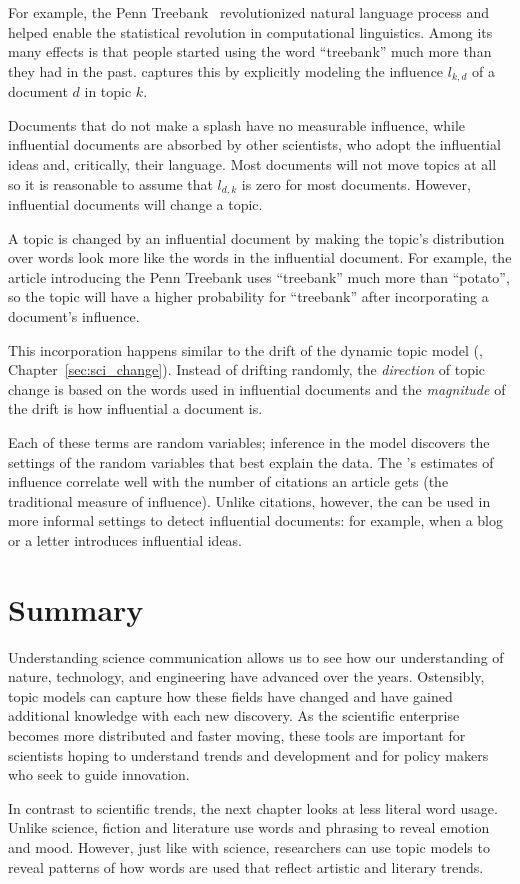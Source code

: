 For example, the Penn Treebank~\citep{marcus-93} revolutionized natural language
process and helped enable the statistical revolution in computational
linguistics.  Among its many effects is that people started using the word
``treebank'' much more than they had in the past.   captures this by
explicitly modeling the influence $l_{k,d}$ of a document $d$ in topic
$k$.

Documents that do not make a splash have no measurable influence, while influential
documents are absorbed by other scientists, who adopt the influential ideas and, critically, their language.  Most documents will not move topics
at all so it is reasonable to assume that $l_{d,k}$ is zero for most
documents.  However, influential documents will change a topic.

A topic is changed by an influential document by making the topic's
distribution over words look more like the words in the influential document.  For example, the article
introducing the Penn Treebank uses ``treebank'' much more than
``potato'', so the topic will have a higher probability for
``treebank'' after incorporating a document's influence.

This incorporation happens similar to the drift of the dynamic topic
model (, Chapter~\ref{sec:sci_change}).  Instead of drifting
randomly, the \emph{direction} of topic change is based on the words
used in influential documents and the \emph{magnitude} of the drift is
how influential a document is.

Each of these terms are random variables; inference in the model discovers the
settings of the random variables that best explain the data.  The 's
estimates of influence correlate well with the number of citations an article
gets (the traditional measure of influence).  Unlike citations, however, the
 can be used in more informal settings to detect influential
documents: for example, when a blog or a letter introduces influential
ideas.

\section{Summary}

Understanding science communication allows us to see how our
understanding of nature, technology, and engineering have advanced
over the years.
Ostensibly, topic models can capture how these fields have changed and
have gained additional knowledge with each new discovery.
As the scientific enterprise becomes more distributed and faster
moving, these tools are important for scientists hoping to understand
trends and development and for policy makers who seek to guide
innovation.

In contrast to scientific trends, the next chapter looks at less
literal word usage.
Unlike science, fiction and literature use words and phrasing to
reveal emotion and mood.
However, just like with science, researchers can use topic models to reveal patterns of how words are used
that reflect artistic and literary trends.
